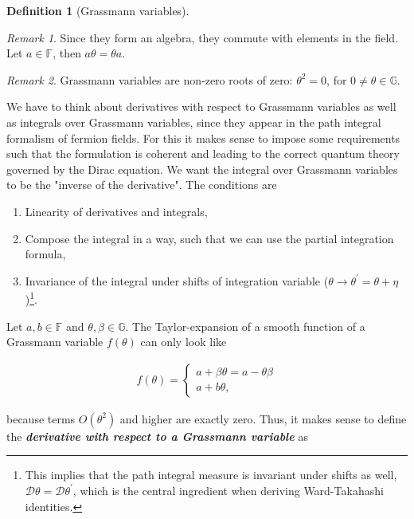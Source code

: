 \documentclass{article}
\theoremstyle{plain} %
\newtheorem{definition}{Definition}[section]
\theoremstyle{convention} %
\theoremstyle{remark} %
\newtheorem*{remark}{Remark} %
\def\df#1{\textbf{\textit{#1}}}
\numberwithin{equation}{section}
\begin{document}
\begin{appendix}
\begin{definition}[Grassmann variables]
\end{definition}

\begin{remark}
  Since they form an algebra, they commute with elements in the field. Let $a \in \mathbb{F}$, then $a \theta = \theta a$.
\end{remark}
\begin{remark}
  Grassmann variables are non-zero roots of zero: $\theta^2 = 0$, for $0 \ne \theta \in \mathbb{G}$.
\end{remark}

We have to think about derivatives with respect to Grassmann variables as well as integrals over Grassmann variables, since they appear in the path integral formalism of fermion fields. For this it makes sense to impose some requirements such that the formulation is coherent and leading to the correct quantum theory governed by the Dirac equation. We want the integral over Grassmann variables to be the "inverse of the derivative". The conditions are

\begin{enumerate}
  \item Linearity of derivatives and integrals,
  \item Compose the integral in a way, such that we can use the partial integration formula,
  \item Invariance of the integral under shifts of integration variable ($\theta \rightarrow \theta^{\prime} = \theta + \eta$)\footnote{This implies that the path integral measure is invariant under shifts as well, $\mathcal{D} \theta = \mathcal{D} \theta^{\prime}$, which is the central ingredient when deriving Ward-Takahashi identities.}.
\end{enumerate}

Let $a,b \in \mathbb{F}$ and $\theta, \beta \in \mathbb{G}$. The Taylor-expansion of a smooth function of a Grassmann variable $f(\theta)$ can only look like

\begin{align*}
  f(\theta) = \left\{
      \begin{array}{ll}
          a + \beta \theta = a - \theta \beta \\
          a + b \theta,
      \end{array}
  \right.
\end{align*}

because terms $O(\theta^2)$ and higher are exactly zero. Thus, it makes sense to define the \df{derivative with respect to a Grassmann variable} as


\end{appendix}
\end{document}
